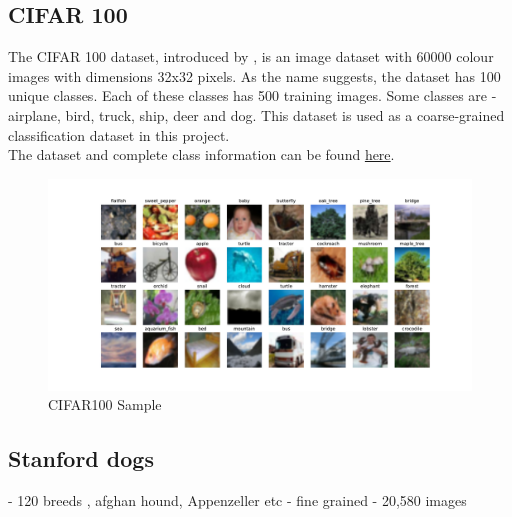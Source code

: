 \subsection{CIFAR 100}
The CIFAR 100 dataset, introduced by \cite{krizhevskyLearningMultipleLayers}, is an image dataset with 60000 colour images with dimensions 32x32 pixels. As the name suggests, the dataset has 100 unique classes. Each of these classes has 500 training images. Some classes are - airplane, bird, truck, ship, deer and dog. This dataset is used as a coarse-grained classification dataset in this project.\\
The dataset and complete class information can be found \href{https://www.kaggle.com/datasets/fedesoriano/cifar100}{here}.



\begin{figure}[H]
    \centering
    \includegraphics[width=1\textwidth]{images/cifar100.pdf}
	\caption{CIFAR100 Sample}
    \label{fig:cifar100}
\end{figure}

\subsection{Stanford dogs}
\cite{khoslaNovelDatasetFineGrained}
- 120 breeds , afghan hound, Appenzeller etc
- fine grained
- 20,580 images

